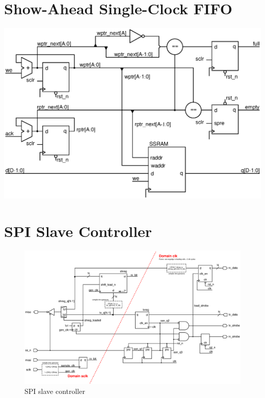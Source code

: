 \documentclass[]{article}
\begin{document}
\clearpage
\section{Show-Ahead Single-Clock FIFO}\label{apx:fifo}

\begin{center}
    \includegraphics[width=.7\linewidth]{../gfx/fifo.eps}
    \label{fig:fifo}
\end{center}

\section{SPI Slave Controller}\label{apx:spi}

\begin{figure}[h!]
    \centering
    \includegraphics[width=\linewidth]{../gfx/spi_slave.eps}
    \caption{SPI slave controller}
    \label{fig:spi_slave}
\end{figure}
\end{document}
